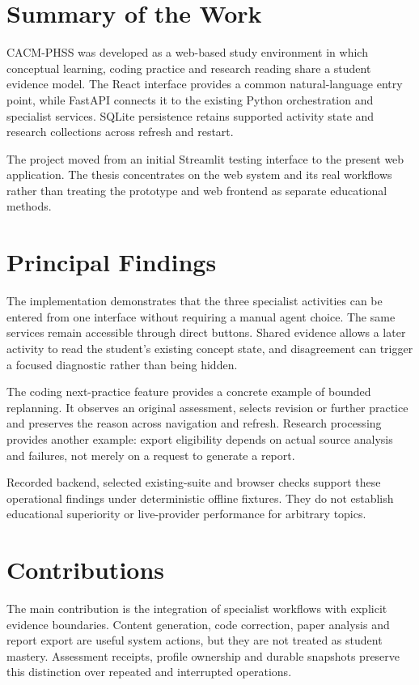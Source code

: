 \section{Summary of the Work}
CACM-PHSS was developed as a web-based study environment in which conceptual learning, coding practice and research reading share a student evidence model. The React interface provides a common natural-language entry point, while FastAPI connects it to the existing Python orchestration and specialist services. SQLite persistence retains supported activity state and research collections across refresh and restart.

The project moved from an initial Streamlit testing interface to the present web application. The thesis concentrates on the web system and its real workflows rather than treating the prototype and web frontend as separate educational methods.

\section{Principal Findings}
The implementation demonstrates that the three specialist activities can be entered from one interface without requiring a manual agent choice. The same services remain accessible through direct buttons. Shared evidence allows a later activity to read the student's existing concept state, and disagreement can trigger a focused diagnostic rather than being hidden.

The coding next-practice feature provides a concrete example of bounded replanning. It observes an original assessment, selects revision or further practice and preserves the reason across navigation and refresh. Research processing provides another example: export eligibility depends on actual source analysis and failures, not merely on a request to generate a report.

Recorded backend, selected existing-suite and browser checks support these operational findings under deterministic offline fixtures. They do not establish educational superiority or live-provider performance for arbitrary topics.

\section{Contributions}
The main contribution is the integration of specialist workflows with explicit evidence boundaries. Content generation, code correction, paper analysis and report export are useful system actions, but they are not treated as student mastery. Assessment receipts, profile ownership and durable snapshots preserve this distinction over repeated and interrupted operations.

